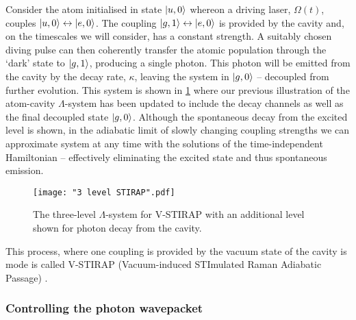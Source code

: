 \documentclass[../Thesis-IJspeert.tex]{subfiles}
\begin{document}
Consider the atom initialised in state $\ket{u,0}$ whereon a driving laser, $\Omega(t)$, couples $\ket{u,0} \leftrightarrow \ket{e,0}$.  The coupling $\ket{g,1} \leftrightarrow \ket{e,0}$ is provided by the cavity and, on the timescales we will consider, has a constant strength.  A suitably chosen diving pulse can then coherently transfer the atomic population through the `dark' state to $\ket{g,1}$, producing a single photon.  This photon will be emitted from the cavity by the decay rate, $\kappa$, leaving the system in $\ket{g,0}$ -- decoupled from further evolution.  This system is shown in \cref{fig:3lvlSTIRAP} where our previous illustration of the atom-cavity $\Lambda$-system has been updated to include the decay channels as well as the final decoupled state $\ket{g,0}$.  Although the spontaneous decay from the excited level is shown, in the adiabatic limit of slowly changing coupling strengths we can approximate system at any time with the solutions of the time-independent Hamiltonian -- effectively eliminating the excited state and thus spontaneous emission.

\begin{figure}[t]
		\centerline{
			\texttt{[image: "3 level STIRAP".pdf]}
			}
		\caption[Basic 3-level lambda system for V-STIRAP]{The three-level $\Lambda$-system for V-STIRAP with an additional level shown for photon decay from the cavity.}
		\label{fig:3lvlSTIRAP} 
\end{figure}

This process, where one coupling is provided by the vacuum state of the cavity is mode is called V-STIRAP (Vacuum-induced STImulated Raman Adiabatic Passage) \cite{kuhn02, kuhn10, nisbet11, nisbet12, nisbet13, holleczek15, dilley12, barter16}.

\subsubsection{Controlling the photon wavepacket}
\end{document}
